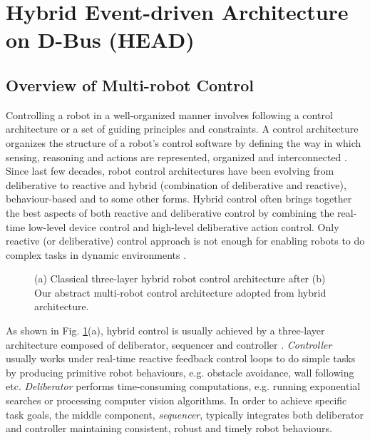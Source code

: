 \documentclass[draft]{ifacconf}
\begin{document}
\section{Hybrid Event-driven Architecture on D-Bus (HEAD)}
\label{sec:head}
\subsection{Overview of Multi-robot Control}
Controlling a robot in a well-organized manner involves following a control architecture or a set of guiding principles and constraints. A control architecture organizes the structure  of a robot's control software by defining the way in which sensing, reasoning and actions are represented, organized and interconnected \citep{Bekey2005}. Since last few decades, robot control architectures have been evolving from deliberative to reactive and hybrid (combination of deliberative and reactive), behaviour-based and to some other forms.  Hybrid control often brings together the best aspects of both reactive and deliberative control by combining the real-time low-level device control and high-level deliberative action control. Only reactive (or deliberative) control approach is not enough for enabling robots to do complex tasks in dynamic environments \citep{Gat1997}.\\
\begin{figure}
\centering
{} 
\hspace{0.25cm}
\caption{(a) Classical three-layer hybrid robot control architecture after \cite{Gat1997} 
(b) Our abstract multi-robot control architecture adopted from hybrid architecture.}
\label{fig:three-layer-arch}
\end{figure}
As shown in Fig. \ref{fig:three-layer-arch}(a), hybrid control is usually achieved by a three-layer architecture composed of deliberator, sequencer and controller . {\em Controller} usually works under real-time reactive feedback control loops to do simple tasks by producing primitive robot behaviours, e.g. obstacle avoidance, wall following etc. {\em Deliberator} performs time-consuming computations, e.g. running exponential searches or processing computer vision algorithms. In order to achieve specific task goals, the middle component, {\em sequencer}, typically integrates both deliberator and controller maintaining consistent, robust and timely robot behaviours.\\
\end{document}
